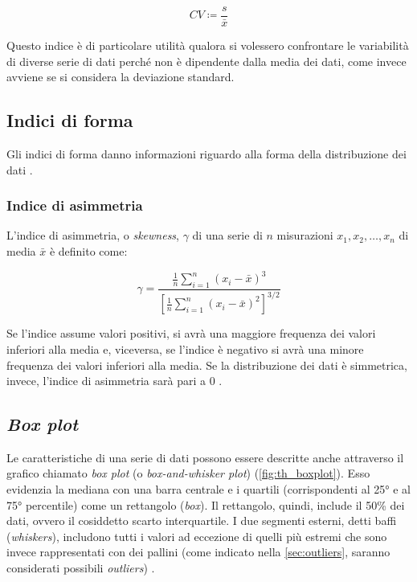 \begin{equation}
CV\coloneqq\frac{s}{\bar{x}}
\end{equation}

Questo indice è di particolare utilità qualora si volessero confrontare le variabilità di diverse serie di dati perché non è dipendente dalla media dei dati, come invece avviene se si considera la deviazione standard. 



\subsection{Indici di forma}
Gli indici di forma danno informazioni riguardo alla forma della distribuzione dei dati \cite{book}.

\subsubsection{Indice di asimmetria}
L'indice di asimmetria, o \textit{skewness}, $\gamma$ di una serie di $n$ misurazioni $x_{1}, x_{2},\dots, x_{n}$ di media $\bar{x}$ è definito come:

\begin{equation}
\gamma=\frac{\frac{1}{n}\sum_{i=1}^{n}(x_{i}-\bar{x})^{3}}{[\frac{1}{n}\sum_{i=1}^{n}(x_{i}-\bar{x})^{2}]^{3/2}}
\end{equation}

Se l'indice assume valori positivi, si avrà una maggiore frequenza dei valori inferiori alla media e, viceversa, se l'indice è negativo si avrà una minore frequenza dei valori inferiori alla media. Se la distribuzione dei dati è simmetrica, invece, l'indice di asimmetria sarà pari a 0 \cite{book}.

\subsection{\textit{Box plot}}
\label{subsec:boxplot_th}

Le caratteristiche di una serie di dati possono essere descritte anche attraverso il grafico chiamato \textit{box plot} (o \textit{box-and-whisker plot}) (\autoref{fig:th_boxplot}). Esso evidenzia la mediana con una barra centrale e i quartili (corrispondenti al 25° e al 75° percentile) come un rettangolo (\textit{box}). Il rettangolo, quindi, include il 50\% dei dati, ovvero il cosiddetto scarto interquartile. I due segmenti esterni, detti baffi (\textit{whiskers}), includono tutti i valori ad eccezione di quelli più estremi che sono invece rappresentati con dei pallini (come indicato nella \autoref{sec:outliers}, saranno considerati possibili \textit{outliers}) \cite{brown2002statistics}.

